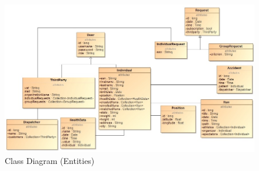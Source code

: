 \documentclass[a4paper]{article}
\begin{document}
\begin{figure}[!htpb]
    \centering
    \advance\leftskip-0.3cm
    \includegraphics[width=1.1\textwidth,keepaspectratio]{DD/images/UML/ClassDiagram1.jpg}
    \caption{Class Diagram (Entities)}
    \label{fig:class_diagram_entities}
\end{figure} 
    
\newpage
\end{document}

